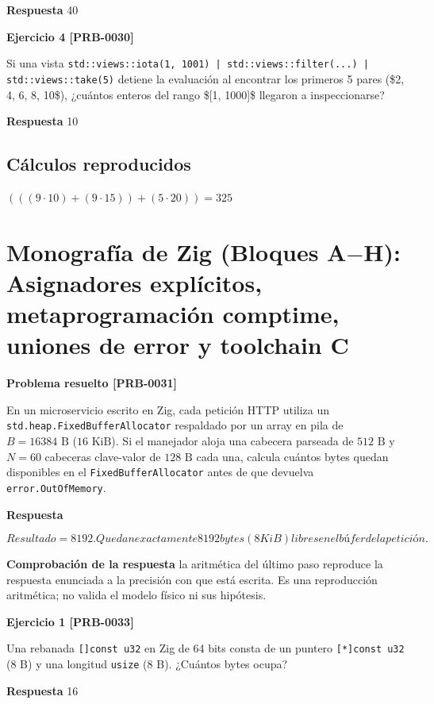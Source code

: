 \documentclass{book}
\begin{document}
\noindent\textbf{Respuesta} 40

\noindent\textbf{Ejercicio 4 [PRB-0030]}

Si una vista \texttt{std::views::iota(1, 1001) | std::views::filter(...) | std::views::take(5)} detiene la evaluación al encontrar los primeros 5 pares (\$2, 4, 6, 8, 10\$), ¿cuántos enteros del rango \$[1, 1000]\$ llegaron a inspeccionarse?

\noindent\textbf{Respuesta} 10

\subsection*{Cálculos reproducidos}

\(\left(\left(\left(9\cdot 10\right)+\left(9\cdot 15\right)\right)+\left(5\cdot 20\right)\right) = 325\)

\section{Monografía de Zig (Bloques A\(-\)H): Asignadores explícitos, metaprogramación comptime, uniones de error y toolchain C}

\noindent\textbf{Problema resuelto [PRB-0031]}

En un microservicio escrito en Zig, cada petición HTTP utiliza un \texttt{std.heap.FixedBufferAllocator} respaldado por un array en pila de \(B = 16384\text{ B}\) (\(16\text{ KiB}\)). Si el manejador aloja una cabecera parseada de \(512\text{ B}\) y \(N = 60\) cabeceras clave-valor de \(128\text{ B}\) cada una, calcula cuántos bytes quedan disponibles en el \texttt{FixedBufferAllocator} antes de que devuelva \texttt{error.OutOfMemory}.

\noindent\textbf{Respuesta}

\[
Resultado = 8192. Quedan exactamente 8192 bytes (8 KiB) libres en el búfer de la petición.
\]

\noindent\textbf{Comprobación de la respuesta} la aritmética del último paso reproduce la respuesta enunciada a la precisión con que está escrita. Es una reproducción aritmética; no valida el modelo físico ni sus hipótesis.

\noindent\textbf{Ejercicio 1 [PRB-0033]}

Una rebanada \texttt{[]const u32} en Zig de 64 bits consta de un puntero \texttt{[*]const u32} (8 B) y una longitud \texttt{usize} (8 B). ¿Cuántos bytes ocupa?

\noindent\textbf{Respuesta} 16
\end{document}
